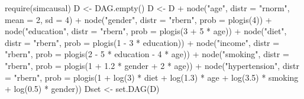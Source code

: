 \documentclass[
  letterpaper,
  DIV=11,
  numbers=noendperiod]{scrreprt}
\newenvironment{Shaded}{\begin{snugshade}}{\end{snugshade}}
\newcommand{\AttributeTok}[1]{\textcolor[rgb]{0.40,0.45,0.13}{#1}}
\newcommand{\DecValTok}[1]{\textcolor[rgb]{0.68,0.00,0.00}{#1}}
\newcommand{\FloatTok}[1]{\textcolor[rgb]{0.68,0.00,0.00}{#1}}
\newcommand{\FunctionTok}[1]{\textcolor[rgb]{0.28,0.35,0.67}{#1}}
\newcommand{\NormalTok}[1]{\textcolor[rgb]{0.00,0.23,0.31}{#1}}
\newcommand{\OtherTok}[1]{\textcolor[rgb]{0.00,0.23,0.31}{#1}}
\newcommand{\SpecialCharTok}[1]{\textcolor[rgb]{0.37,0.37,0.37}{#1}}
\newcommand{\StringTok}[1]{\textcolor[rgb]{0.13,0.47,0.30}{#1}}
\begin{document}
\begin{Shaded}
\begin{Highlighting}[]
\FunctionTok{require}\NormalTok{(simcausal)}
\NormalTok{D }\OtherTok{\textless{}{-}} \FunctionTok{DAG.empty}\NormalTok{()}
\NormalTok{D }\OtherTok{\textless{}{-}}\NormalTok{ D }\SpecialCharTok{+} 
  \FunctionTok{node}\NormalTok{(}\StringTok{"age"}\NormalTok{, }\AttributeTok{distr =} \StringTok{"rnorm"}\NormalTok{, }
       \AttributeTok{mean =} \DecValTok{2}\NormalTok{, }\AttributeTok{sd =} \DecValTok{4}\NormalTok{) }\SpecialCharTok{+} 
  \FunctionTok{node}\NormalTok{(}\StringTok{"gender"}\NormalTok{, }\AttributeTok{distr =} \StringTok{"rbern"}\NormalTok{, }
       \AttributeTok{prob =} \FunctionTok{plogis}\NormalTok{(}\DecValTok{4}\NormalTok{)) }\SpecialCharTok{+}
  \FunctionTok{node}\NormalTok{(}\StringTok{"education"}\NormalTok{, }\AttributeTok{distr =} \StringTok{"rbern"}\NormalTok{, }
       \AttributeTok{prob =} \FunctionTok{plogis}\NormalTok{(}\DecValTok{3} \SpecialCharTok{+} \DecValTok{5} \SpecialCharTok{*}\NormalTok{ age)) }\SpecialCharTok{+}
  \FunctionTok{node}\NormalTok{(}\StringTok{"diet"}\NormalTok{, }\AttributeTok{distr =} \StringTok{"rbern"}\NormalTok{, }
       \AttributeTok{prob =} \FunctionTok{plogis}\NormalTok{(}\DecValTok{1} \SpecialCharTok{{-}} \DecValTok{3} \SpecialCharTok{*}\NormalTok{ education)) }\SpecialCharTok{+}
  \FunctionTok{node}\NormalTok{(}\StringTok{"income"}\NormalTok{, }\AttributeTok{distr =} \StringTok{"rbern"}\NormalTok{, }
       \AttributeTok{prob =} \FunctionTok{plogis}\NormalTok{(}\DecValTok{2} \SpecialCharTok{{-}} \DecValTok{5} \SpecialCharTok{*}\NormalTok{ education }\SpecialCharTok{{-}} \DecValTok{4} \SpecialCharTok{*}\NormalTok{ age)) }\SpecialCharTok{+}
  \FunctionTok{node}\NormalTok{(}\StringTok{"smoking"}\NormalTok{, }\AttributeTok{distr =} \StringTok{"rbern"}\NormalTok{, }
       \AttributeTok{prob =} \FunctionTok{plogis}\NormalTok{(}\DecValTok{1} \SpecialCharTok{+} \FloatTok{1.2} \SpecialCharTok{*}\NormalTok{ gender }\SpecialCharTok{+} \DecValTok{2} \SpecialCharTok{*}\NormalTok{ age)) }\SpecialCharTok{+}
  \FunctionTok{node}\NormalTok{(}\StringTok{"hypertension"}\NormalTok{, }\AttributeTok{distr =} \StringTok{"rbern"}\NormalTok{, }
       \AttributeTok{prob =} \FunctionTok{plogis}\NormalTok{(}\DecValTok{1} \SpecialCharTok{+} \FunctionTok{log}\NormalTok{(}\DecValTok{3}\NormalTok{) }\SpecialCharTok{*}\NormalTok{ diet }\SpecialCharTok{+} 
                       \FunctionTok{log}\NormalTok{(}\FloatTok{1.3}\NormalTok{) }\SpecialCharTok{*}\NormalTok{ age }\SpecialCharTok{+} 
                       \FunctionTok{log}\NormalTok{(}\FloatTok{3.5}\NormalTok{) }\SpecialCharTok{*}\NormalTok{ smoking }\SpecialCharTok{+} 
                       \FunctionTok{log}\NormalTok{(}\FloatTok{0.5}\NormalTok{) }\SpecialCharTok{*}\NormalTok{ gender))}
\NormalTok{Dset }\OtherTok{\textless{}{-}} \FunctionTok{set.DAG}\NormalTok{(D)}
\end{Highlighting}
\end{Shaded}
\end{document}
